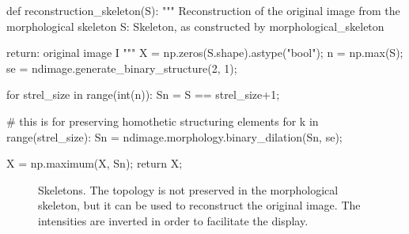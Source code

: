 \begin{python}
def reconstruction_skeleton(S):
    """
    Reconstruction of the original image from the morphological skeleton
    S: Skeleton, as constructed by morphological_skeleton
    
    return: original image I
    """
    X = np.zeros(S.shape).astype("bool");
    n = np.max(S);
    se = ndimage.generate_binary_structure(2, 1);
    
    for strel_size in range(int(n)):
        Sn = S == strel_size+1;
        
        # this is for preserving homothetic structuring elements
        for k in range(strel_size):
            Sn = ndimage.morphology.binary_dilation(Sn, se);
        
        X = np.maximum(X, Sn);
    return X;
\end{python}
 
\begin{figure}[htbp]
 \centering\caption{Skeletons. The topology is not preserved in the morphological skeleton, but it can be used to reconstruct the original image. The intensities are inverted in order to facilitate the display.}%
 \hspace*{1cm}
 \label{fig:morphological_skeleton:python:skeletons}%
\end{figure}

